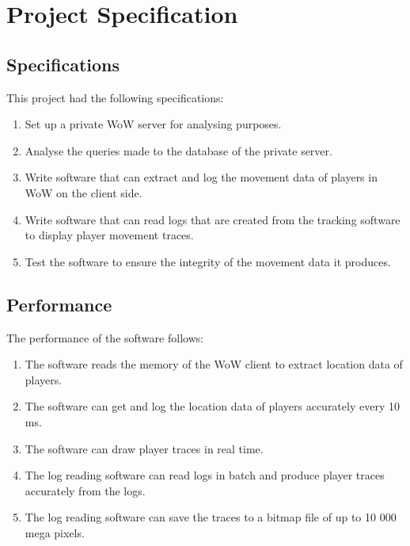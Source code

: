 \chapter{Project Specification}

\section{Specifications}
This project had the following specifications:

\begin{enumerate}
	\item Set up a private WoW server for analysing purposes.
	\item Analyse the queries made to the database of the private server.
	\item Write software that can extract and log the movement data of players in WoW on the client side.
	\item Write software that can read logs that are created from the tracking software to display player movement traces.
	\item Test the software to ensure the integrity of the movement data it produces.
\end{enumerate}

\section{Performance}
The performance of the software follows:

\begin{enumerate}
	\item The software reads the memory of the WoW client to extract location data of players.
	\item The software can get and log the location data of players accurately every 10 ms.
	\item The software can draw player traces in real time.
	\item The log reading software can read logs in batch and produce player traces accurately from the logs.
	\item The log reading software can save the traces to a bitmap file of up to 10 000 mega pixels.
\end{enumerate}

